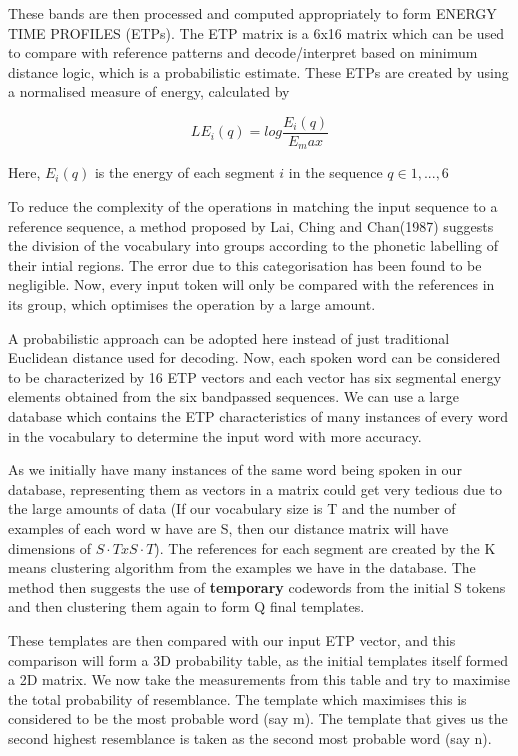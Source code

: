 These bands are then processed and computed appropriately to form ENERGY
TIME PROFILES (ETPs). The ETP matrix is a 6x16 matrix which can be used
to compare with reference patterns and decode/interpret based on minimum
distance logic, which is a probabilistic estimate. These ETPs are
created by using a normalised measure of energy, calculated by

\[LE_i (q) = log\frac{E_i(q)}{E_max}\]

Here, \(E_i(q)\) is the energy of each segment \(i\) in the sequence
\(q \in {1, ..., 6}\)

To reduce the complexity of the operations in matching the input
sequence to a reference sequence, a method proposed by Lai, Ching and
Chan(1987) suggests the division of the vocabulary into groups according
to the phonetic labelling of their intial regions. The error due to this
categorisation has been found to be negligible. Now, every input token
will only be compared with the references in its group, which optimises
the operation by a large amount.

A probabilistic approach can be adopted here instead of just traditional
Euclidean distance used for decoding. Now, each spoken word can be
considered to be characterized by 16 ETP vectors and each vector has six
segmental energy elements obtained from the six bandpassed sequences. We
can use a large database which contains the ETP characteristics of many
instances of every word in the vocabulary to determine the input word
with more accuracy.

As we initially have many instances of the same word being spoken in our
database, representing them as vectors in a matrix could get very
tedious due to the large amounts of data (If our vocabulary size is T
and the number of examples of each word w have are S, then our distance
matrix will have dimensions of \(S\cdot T x S\cdot T\)). The references
for each segment are created by the K means clustering algorithm from
the examples we have in the database. The method then suggests the use
of \textbf{temporary} codewords from the initial S tokens and then
clustering them again to form Q final templates.

These templates are then compared with our input ETP vector, and this
comparison will form a 3D probability table, as the initial templates
itself formed a 2D matrix. We now take the measurements from this table
and try to maximise the total probability of resemblance. The template
which maximises this is considered to be the most probable word (say m).
The template that gives us the second highest resemblance is taken as
the second most probable word (say n).

